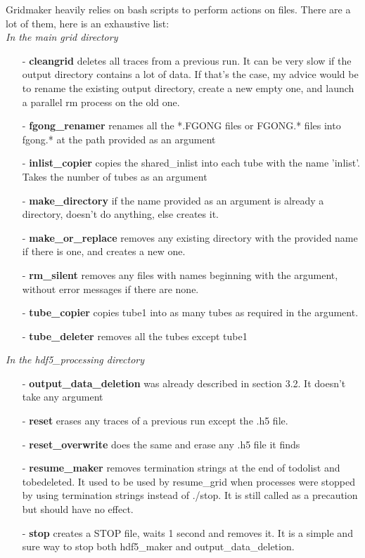 \documentclass{report}
\begin{document}
Gridmaker heavily relies on bash scripts to perform actions on files. There are a lot of them, here is an exhaustive list:\\
\textit{In the main grid directory}
\begin{itemize}
\item[-]\textbf{cleangrid} deletes all traces from a previous run. It can be very slow if the output directory contains a lot of data. If that's the case, my advice would be to rename the existing output directory, create a new empty one, and launch a parallel rm process on the old one.
\item[-]\textbf{fgong\_renamer} renames all the *.FGONG files or FGONG.* files into fgong.* at the path provided as an argument
\item[-]\textbf{inlist\_copier} copies the shared\_inlist into each tube with the name 'inlist'. Takes the number of tubes as an argument
\item[-]\textbf{make\_directory} if the name provided as an argument is already a directory, doesn't do anything, else creates it. 
\item[-]\textbf{make\_or\_replace} removes any existing directory with the provided name if there is one, and creates a new one. 
\item[-]\textbf{rm\_silent} removes any files with names beginning with the argument, without error messages if there are none.
\item[-]\textbf{tube\_copier} copies tube1 into as many tubes as required in the argument.
\item[-]\textbf{tube\_deleter} removes all the tubes except tube1
\end{itemize}

\textit{In the hdf5\_processing directory}
\begin{itemize}
\item[-]\textbf{output\_data\_deletion} was already described in section 3.2. It doesn't take any argument
\item[-]\textbf{reset} erases any traces of a previous run except the .h5 file.
\item[-]\textbf{reset\_overwrite} does the same and erase any .h5 file it finds
\item[-]\textbf{resume\_maker} removes termination strings at the end of todolist and tobedeleted. It used to be used by resume\_grid when processes were stopped by using termination strings instead of ./stop. It is still called as a precaution but should have no effect.
\item[-]\textbf{stop} creates a STOP file, waits 1 second and removes it. It is a simple and sure way to stop both hdf5\_maker and output\_data\_deletion.
\end{itemize}  
\end{document}
